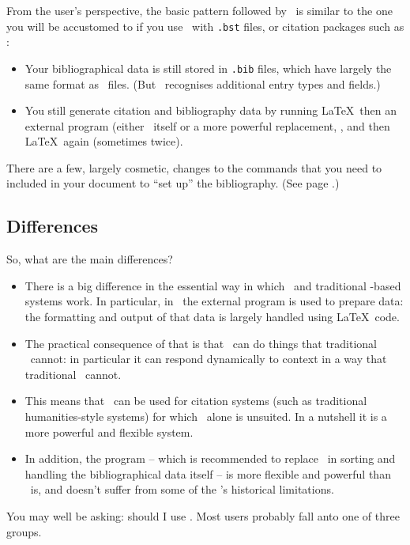 From the user's perspective, the basic pattern followed by \biblatex\ is similar to the one you will be accustomed to if you use \bibtex\ with \verb|.bst| files, or citation packages such as :
\begin{itemize}
\item Your bibliographical data is still stored in \verb|.bib| files, which have largely the same format as \bibtex\ files. (But \biblatex\ recognises additional entry types and fields.)
\item You still generate citation and bibliography data by running \LaTeX\, then an external program (either \bibtex\ itself or a more powerful replacement, , and then \LaTeX\ again (sometimes twice).
\end{itemize}

There are a few, largely cosmetic, changes to the commands that you need to included in your document to ``set up'' the bibliography. (See page \pageref{bibtex:simple:eg}.)

\subsection{Differences}

So, what are the main differences?
\begin{itemize}
\item There is a big difference in the essential way in which \biblatex\ and traditional \bibtex-based systems work. In particular, in \biblatex\ the external program is used to prepare data: the formatting and output of that data is largely handled using \LaTeX\ code.
\item The practical consequence of that is that \biblatex\ can do things that traditional \bibtex\ cannot: in particular it can respond dynamically to context in a way that traditional \bibtex\ cannot.
\item This means that \biblatex\ can be used for citation systems (such as traditional humanities-style systems) for which \bibtex\ alone is unsuited. In a nutshell it is a more powerful and flexible system.
\item In addition, the  program -- which is recommended to replace \bibtex\ in sorting and handling the bibliographical data itself -- is more flexible and powerful than \bibtex\ is, and doesn't suffer from some of the \bibtex's historical limitations.
\end{itemize}

You may well be asking: should I use \biblatex. Most users probably fall anto one of three groups.

